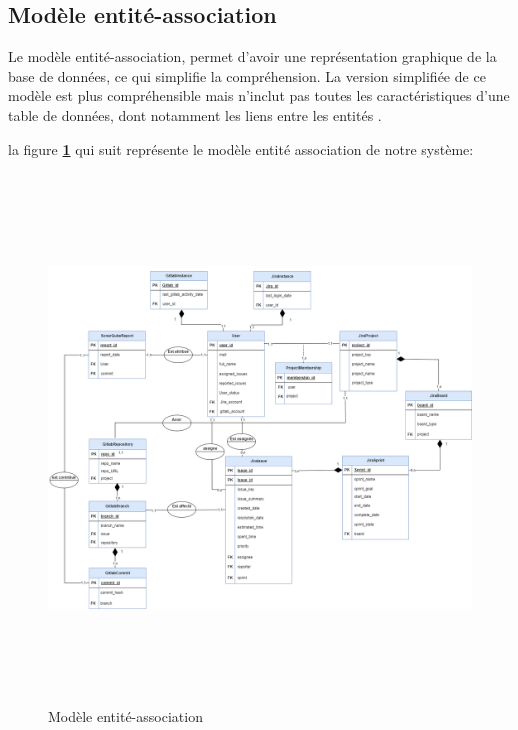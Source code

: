 \subsection{Modèle entité-association}
\par Le modèle entité-association, permet d’avoir une représentation graphique de la base de données, ce qui simplifie la compréhension. La version simplifiée de ce modèle est plus compréhensible mais n'inclut pas toutes les caractéristiques d'une table de données, dont notamment les liens entre les entités \cite{E_A}. 
\par la figure \textbf{\ref{fig:e_a}} qui suit représente le modèle entité association de notre système: 
        \begin{figure}[H]
        \centering
        \includegraphics[width = 17cm , height=14cm]{img/conception/E_a.png}
        \caption{Modèle entité-association}
        \label{fig:e_a}
        \end{figure}
